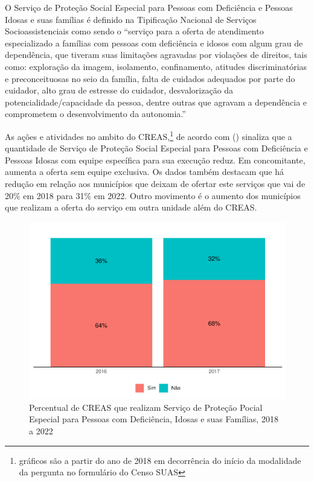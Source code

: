 \documentclass[
  brazilian]{report}
\begin{document}
O Serviço de Proteção Social Especial para Pessoas com Deficiência e
Pessoas Idosas e suas famílias é definido na Tipificação Nacional de
Serviços Socioassistenciais como sendo o ``serviço para a oferta de
atendimento especializado a famílias com pessoas com deficiência e
idosos com algum grau de dependência, que tiveram suas limitações
agravadas por violações de direitos, tais como: exploração da imagem,
isolamento, confinamento, atitudes discriminatórias e preconceituosas no
seio da família, falta de cuidados adequados por parte do cuidador, alto
grau de estresse do cuidador, desvalorização da
potencialidade/capacidade da pessoa, dentre outras que agravam a
dependência e comprometem o desenvolvimento da autonomia.''

As ações e atividades no ambito do
CREAS,\footnote{gráficos são a partir do ano de 2018 em decorrência do início da modalidade da pergunta no formulário do Censo SUAS}
de acordo com () sinaliza que a quantidade
de Serviço de Proteção Social Especial para Pessoas com Deficiência e
Pessoas Idosas com equipe específica para sua execução reduz. Em
concomitante, aumenta a oferta sem equipe exclusiva. Os dados também
destacam que há redução em relação aos municípios que deixam de ofertar
este serviços que vai de 20\% em 2018 para 31\% em 2022. Outro movimento
é o aumento dos municípios que realizam a oferta do serviço em outra
unidade além do CREAS.

\begin{figure}
\includegraphics{Censo-SUAS-2022_files/figure-latex/creas-pse-domicilio-1} \caption[Percentual de CREAS que realizam Serviço de Proteção Pocial Especial para Pessoas com Deficiência, Idosas e suas Famílias, 2018 a 2022]{Percentual de CREAS que realizam Serviço de Proteção Pocial Especial para Pessoas com Deficiência, Idosas e suas Famílias, 2018 a 2022}\label{fig:creas-pse-domicilio}
\end{figure}
\end{document}
